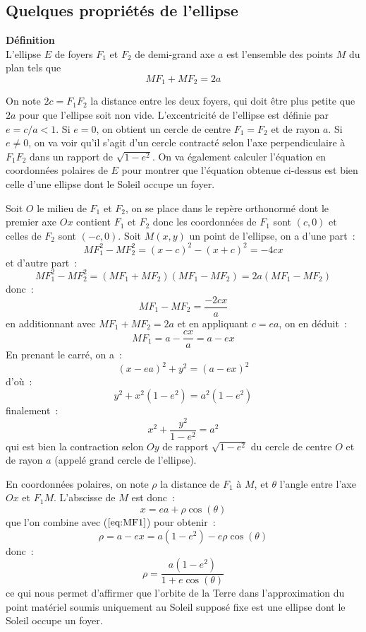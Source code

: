 \documentclass[a4paper,11pt]{article}
\begin{document}
\begin{giacjshere}
\subsection{Quelques propriétés de l'ellipse}
{\bf D\'efinition}\\
L'ellipse $E$ de foyers $F_1$ et $F_2$ de demi-grand axe
$a$ est l'ensemble des points $M$ du plan tels que 
\[ MF_1+MF_2=2a\]

On note $2c=F_1F_2$ la distance entre les deux foyers, qui doit \^etre
plus petite que $2a$ pour que l'ellipse soit non vide.
L'excentricit\'e de l'ellipse est d\'efinie par $e=c/a < 1$. Si $e=0$,
on obtient un cercle de centre $F_1=F_2$ et de rayon $a$. Si $e\neq 0$,
on va voir qu'il s'agit d'un cercle contracté
selon l'axe perpendiculaire \`a $F_1F_2$ dans un rapport de 
$\sqrt{1-e^2}$. On va \'egalement calculer l'\'equation en
coordonn\'ees polaires de $E$ pour montrer que l'\'equation obtenue
ci-dessus est bien celle d'une ellipse dont le Soleil occupe un foyer.

Soit $O$ le milieu de $F_1$ et $F_2$, on se place dans le rep\`ere orthonorm\'e
dont le premier axe $Ox$ contient $F_1$ et $F_2$ donc les
coordonn\'ees de $F_1$ sont $(c,0)$ et celles de $F_2$ sont $(-c,0)$. 
Soit $M(x,y)$ un
point de l'ellipse, on a d'une part~:
\[ MF_1^2 - MF_2^2 = (x-c)^2-(x+c)^2 = -4cx \]
et d'autre part~:
\[ MF_1^2 - MF_2^2 = (MF_1 + MF_2)(MF_1 - MF_2 ) = 2a (MF_1 - MF_2 )\]
donc~:
\[ MF_1 - MF_2 = \frac{-2cx}{a} \]
en additionnant avec $MF_1+MF_2=2a$ et en appliquant $c=ea$, on en d\'eduit~:
\begin{equation} \label{eq:MF1bis}
 MF_1 = a - \frac{cx}{a} = a-ex 
\end{equation}
En prenant le carr\'e, on a~:
\[ (x-ea)^2 + y^2 = (a-ex)^2\]
d'o\`u~:
\[ y^2 + x^2 (1-e^2) = a^2(1-e^2) \]
finalement~:
\[ x^2 + \frac{y^2}{1-e^2} = a^2 \]
qui est bien la contraction selon $Oy$ de rapport $\sqrt{1-e^2}$ du
cercle de centre $O$ et de rayon $a$ (appel\'e grand cercle de
l'ellipse).

En coordonn\'ees polaires, on note $\rho$ la distance de $F_1$ \`a
$M$, et $\theta$ l'angle entre l'axe $Ox$ et $F_1M$. L'abscisse de $M$
est donc~:
\[ x= ea + \rho \cos(\theta)\]
que l'on combine avec (\(\ref{eq:MF1}\)) pour obtenir~:
\[ \rho = a-ex =a(1-e^2) - e \rho \cos(\theta) \]
donc~:
\[ \rho = \frac{a(1-e^2)}{1+e\cos(\theta)} \]
ce qui nous permet d'affirmer que l'orbite de la Terre dans
l'approximation du point mat\'eriel soumis uniquement au Soleil
suppos\'e fixe est une ellipse dont le Soleil occupe un foyer.


\end{giacjshere}
\end{document}
